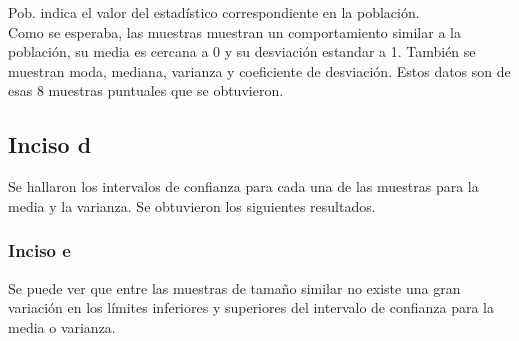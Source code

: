 \documentclass[a4paper,10pt,twocolumn]{article}
\begin{document}
		Pob. indica el valor del estadístico correspondiente en la población.\\
		
		Como se esperaba, las muestras muestran un comportamiento similar a la población, su media es cercana a 0 y su desviación estandar a 1. También se muestran moda, mediana, varianza y coeficiente de desviación. Estos datos son de esas 8 muestras puntuales que se obtuvieron.
		
		\subsection{Inciso d}
		
		Se hallaron los intervalos de confianza para cada una de las muestras para la media y la varianza. Se obtuvieron los siguientes resultados.
		
		\begin{center}
			\centering 
		\end{center}
		
		\subsubsection{Inciso e}
		
		Se puede ver que entre las muestras de tamaño similar no existe una gran variación en los límites inferiores y superiores del intervalo de confianza para la media o varianza.
\end{document}
